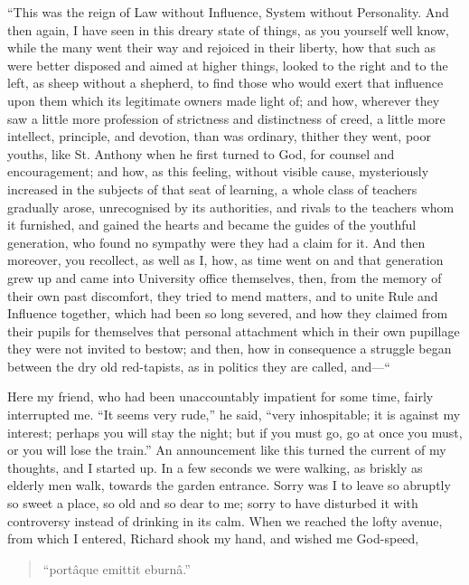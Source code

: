 ``This was the reign of Law without Influence, System without
Personality. And then again, I have seen in this dreary state of
things, as you yourself well know, while the many went their way and
rejoiced in their liberty, how that such as were better disposed and
aimed at higher things, looked to the right and to the left, as sheep
without a shepherd, to find those who would exert that influence upon
them which its legitimate owners made light of; and how, wherever they
saw a little more profession of strictness and distinctness of creed,
a little more intellect, principle, and devotion, than was ordinary,
thither they went, poor youths, like St. Anthony when he first
turned to God, for counsel and encouragement; and how, as this
feeling, without visible cause, mysteriously increased in the subjects
of that seat of learning, a whole class of teachers gradually arose,
unrecognised by its authorities, and rivals to the teachers whom it
furnished, and gained the hearts and became the guides of the youthful
generation, who found no sympathy were they had a claim for it. And
then moreover, you recollect, as well as I, how, as time went on and
that generation grew up and came into University office themselves,
then, from the memory of their own past discomfort, they tried to mend
matters, and to unite Rule and Influence together, which had been so
long severed, and how they claimed from their pupils for themselves
that personal attachment which in their own pupillage they were not
invited to bestow; and then, how in consequence a struggle began
between the dry old red-tapists, as in politics they are called, and—``

Here my friend, who had been unaccountably impatient for some time,
fairly interrupted me. ``It seems very rude,'' he said,
``very inhospitable; it is against my interest; perhaps you will
stay the night; but if you must go, go at once you must, or you will
lose the train.'' An announcement like this turned the current of
my thoughts, and I started up. In a few seconds we were walking, as
briskly as elderly men walk, towards the garden entrance. Sorry was I
to leave so abruptly so sweet a place, so old and so dear to me; sorry
to have disturbed it with controversy instead of drinking in its calm.
When we reached the lofty avenue, from which I entered, Richard shook
my hand, and wished me God-speed,

\begin{quote}

``portâque emittit eburnâ.''

\end{quote}


